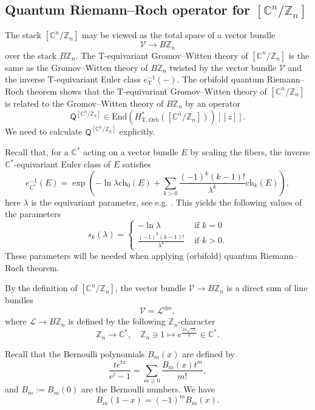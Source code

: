 \documentclass[12pt]{amsart}
\numberwithin{equation}{section}
\newcommand{\CnZn}{[\mathbb{C}^n/\mathbb{Z}_n]}
\begin{document}
\subsection{Quantum Riemann--Roch operator for \texorpdfstring{$[\mathbb{C}^n/\mathbb{Z}_n]$}{CnZn}}\label{sec:QRRCnZn}
The stack $\CnZn$ may be viewed as the total space of a vector bundle $$\mathcal{V}\to B\mathbb{Z}_n$$ over the stack $B\mathbb{Z}_n$. The $\mathrm{T}$-equivariant Gromov--Witten theory of $\CnZn$ is the same as the Gromov--Witten theory of $B\mathbb{Z}_n$ twisted by the vector bundle $\mathcal{V}$ and the inverse $\mathrm{T}$-equivariant Euler class $e_{\mathrm{T}}^{-1}(-)$. The orbifold quantum Riemann--Roch theorem \cite{Tseng} shows that the $\mathrm{T}$-equivariant Gromov--Witten theory of $\CnZn$ is related to the Gromov--Witten theory of $B\mathbb{Z}_n$ by an operator 
$$\mathsf{Q}^{\CnZn}\in \text{End}(H^*_{\mathrm{T, Orb}}(\CnZn))[\![z]\!].$$ 
We need to calculate $\mathsf{Q}^{\CnZn}$ explicitly.

Recall that, for a $\mathbb{C}^*$ acting on a vector bundle $E$ by scaling the fibers, the inverse $\mathbb{C}^*$-equivariant Euler class of $E$ satisfies
\begin{equation*}
    e_{\mathbb{C}^*}^{-1}(E)=\exp\left(-\ln\lambda\text{ch}_0(E)+\sum_{k>0}\frac{(-1)^k(k-1)!}{\lambda^k}\text{ch}_k(E) \right),
\end{equation*}
here $\lambda$ is the equivariant parameter, see e.g. \cite[Section 4]{cg}. This yields the following values of the parameters 
\begin{equation}\label{eqn:QRR_parameters}
s_k(\lambda)=
\begin{cases}
-\ln\lambda & \text{ if } k=0\\
\frac{(-1)^k(k-1)!}{\lambda^k} & \text{ if } k>0.
\end{cases}    
\end{equation}
These parameters will be needed when applying (orbifold) quantum Riemann--Roch theorem.

By the definition of $\CnZn$, the vector bundle $\mathcal{V}\to B\mathbb{Z}_n$ is a direct sum of line bundles $$\mathcal{V}=\mathcal{L}^{\oplus n},$$ where $\mathcal{L}\to B\mathbb{Z}_n$ is defined by the following $\mathbb{Z}_n$-character $$\mathbb{Z}_n\to \mathbb{C}^*, \quad \mathbb{Z}_n\ni 1\mapsto e^{\frac{2\pi\sqrt{-1}}{n}}\in \mathbb{C}^*.$$

Recall that the Bernoulli polynomials $B_m(x)$ are defined by $$\frac{te^{tx}}{e^t-1}=\sum_{m\geq 0}\frac{B_m(x)t^m}{m!},$$
and $B_m:=B_m(0)$ are the Bernoulli numbers. We have 
\begin{equation}\label{eqn:bernoulli_reflect}
B_m(1-x)=(-1)^mB_m(x).
\end{equation}
\end{document}

